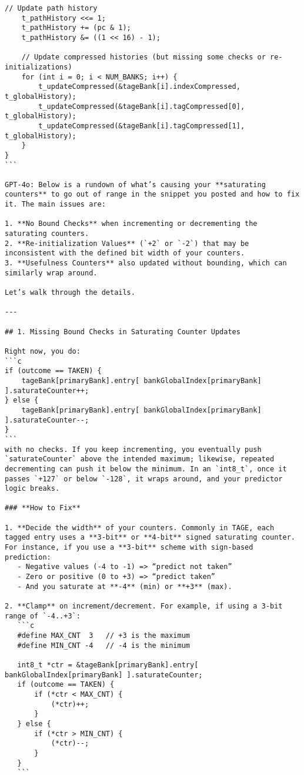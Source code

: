 \documentclass[sigconf, screen]{acmart}
\begin{document}
\begin{Verbatim}[fontsize=\tiny, breaklines=true]
    // Update path history
    t_pathHistory <<= 1;
    t_pathHistory += (pc & 1);
    t_pathHistory &= ((1 << 16) - 1);

    // Update compressed histories (but missing some checks or re-initializations)
    for (int i = 0; i < NUM_BANKS; i++) {
        t_updateCompressed(&tageBank[i].indexCompressed, t_globalHistory);
        t_updateCompressed(&tageBank[i].tagCompressed[0], t_globalHistory);
        t_updateCompressed(&tageBank[i].tagCompressed[1], t_globalHistory);
    }
}
```

GPT-4o: Below is a rundown of what’s causing your **saturating counters** to go out of range in the snippet you posted and how to fix it. The main issues are:

1. **No Bound Checks** when incrementing or decrementing the saturating counters.  
2. **Re-initialization Values** (`+2` or `-2`) that may be inconsistent with the defined bit width of your counters.  
3. **Usefulness Counters** also updated without bounding, which can similarly wrap around.  

Let’s walk through the details.

---

## 1. Missing Bound Checks in Saturating Counter Updates

Right now, you do:
```c
if (outcome == TAKEN) {
    tageBank[primaryBank].entry[ bankGlobalIndex[primaryBank] ].saturateCounter++;
} else {
    tageBank[primaryBank].entry[ bankGlobalIndex[primaryBank] ].saturateCounter--;
}
```
with no checks. If you keep incrementing, you eventually push `saturateCounter` above the intended maximum; likewise, repeated decrementing can push it below the minimum. In an `int8_t`, once it passes `+127` or below `-128`, it wraps around, and your predictor logic breaks.

### **How to Fix**

1. **Decide the width** of your counters. Commonly in TAGE, each tagged entry uses a **3-bit** or **4-bit** signed saturating counter. For instance, if you use a **3-bit** scheme with sign-based prediction:
   - Negative values (-4 to -1) => “predict not taken”  
   - Zero or positive (0 to +3) => “predict taken”  
   - And you saturate at **-4** (min) or **+3** (max).  

2. **Clamp** on increment/decrement. For example, if using a 3-bit range of `-4..+3`:
   ```c
   #define MAX_CNT  3   // +3 is the maximum
   #define MIN_CNT -4   // -4 is the minimum

   int8_t *ctr = &tageBank[primaryBank].entry[ bankGlobalIndex[primaryBank] ].saturateCounter;
   if (outcome == TAKEN) {
       if (*ctr < MAX_CNT) {
           (*ctr)++;
       }
   } else {
       if (*ctr > MIN_CNT) {
           (*ctr)--;
       }
   }
   ```


\end{Verbatim}
\end{document}
